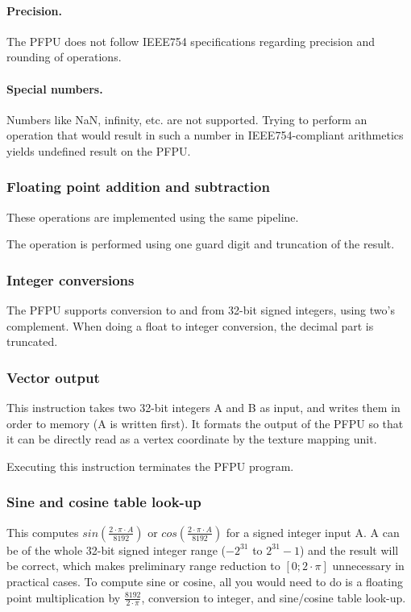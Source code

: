 \documentclass[a4paper,11pt]{article}
\begin{document}
\paragraph{Precision.} The PFPU does not follow IEEE754 specifications regarding precision and rounding of operations.

\paragraph{Special numbers.} Numbers like NaN, infinity, etc. are not supported. Trying to perform an operation that would result in such a number in IEEE754-compliant arithmetics yields undefined result on the PFPU.

\subsubsection{Floating point addition and subtraction}
These operations are implemented using the same pipeline.

The operation is performed using one guard digit and truncation of the result.

\subsubsection{Integer conversions}
The PFPU supports conversion to and from 32-bit signed integers, using two's complement. When doing a float to integer conversion, the decimal part is truncated.

\subsubsection{Vector output}
This instruction takes two 32-bit integers A and B as input, and writes them in order to memory (A is written first). It formats the output of the PFPU so that it can be directly read as a vertex coordinate by the texture mapping unit.

Executing this instruction terminates the PFPU program.

\subsubsection{Sine and cosine table look-up}
This computes $sin(\frac{2 \cdot \pi \cdot A}{8192})$ or $cos(\frac{2 \cdot \pi \cdot A}{8192})$ for a signed integer input A. A can be of the whole 32-bit signed integer range ($-2^{31}$ to $2^{31}-1$) and the result will be correct, which makes preliminary range reduction to $[0;2\cdot\pi]$ unnecessary in practical cases. To compute sine or cosine, all you would need to do is a floating point multiplication by $\frac{8192}{2 \cdot \pi}$, conversion to integer, and sine/cosine table look-up.
\end{document}
